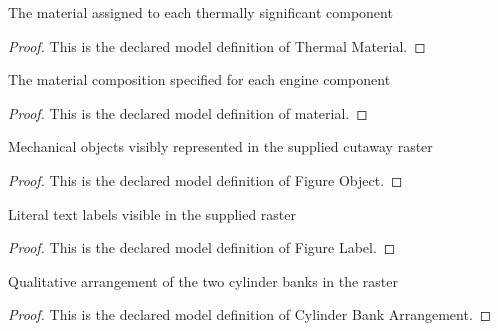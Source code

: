 \begin{definition}
  \label{def:physics:phyx-mini-0456:phyxminiproblems-problemphyxmini0456-thermalmaterial}
  The material assigned to each thermally significant component
\end{definition}
\begin{proof}
  This is the declared model definition of Thermal Material.
\end{proof}
\begin{definition}[material]
  \label{def:physics:phyx-mini-0456:phyxminiproblems-problemphyxmini0456-enginecomponent-material}
  The material composition specified for each engine component
\end{definition}
\begin{proof}
  This is the declared model definition of material.
\end{proof}
\begin{definition}
  \label{def:physics:phyx-mini-0456:phyxminiproblems-problemphyxmini0456-figureobject}
  Mechanical objects visibly represented in the supplied cutaway raster
\end{definition}
\begin{proof}
  This is the declared model definition of Figure Object.
\end{proof}
\begin{definition}
  \label{def:physics:phyx-mini-0456:phyxminiproblems-problemphyxmini0456-figurelabel}
  Literal text labels visible in the supplied raster
\end{definition}
\begin{proof}
  This is the declared model definition of Figure Label.
\end{proof}
\begin{definition}
  \label{def:physics:phyx-mini-0456:phyxminiproblems-problemphyxmini0456-cylinderbankarrangement}
  Qualitative arrangement of the two cylinder banks in the raster
\end{definition}
\begin{proof}
  This is the declared model definition of Cylinder Bank Arrangement.
\end{proof}
